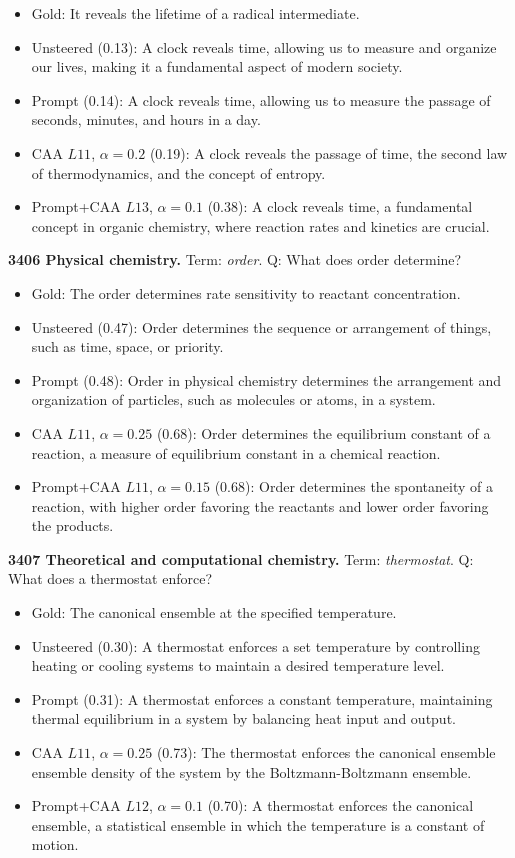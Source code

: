 \begin{itemize}\setlength{\itemsep}{0.15em}\setlength{\parsep}{0pt}\setlength{\topsep}{0.2em}
\item Gold: It reveals the lifetime of a radical intermediate.
\item Unsteered (0.13): A clock reveals time, allowing us to measure and organize our lives, making it a fundamental aspect of modern society.
\item Prompt (0.14): A clock reveals time, allowing us to measure the passage of seconds, minutes, and hours in a day.
\item CAA $L11$, $\alpha=0.2$ (0.19): A clock reveals the passage of time, the second law of thermodynamics, and the concept of entropy.
\item Prompt+CAA $L13$, $\alpha=0.1$ (0.38): A clock reveals time, a fundamental concept in organic chemistry, where reaction rates and kinetics are crucial.
\end{itemize}
\medskip\noindent\textbf{3406 Physical chemistry.} Term: \emph{order}.
Q: What does order determine?
\begin{itemize}\setlength{\itemsep}{0.15em}\setlength{\parsep}{0pt}\setlength{\topsep}{0.2em}
\item Gold: The order determines rate sensitivity to reactant concentration.
\item Unsteered (0.47): Order determines the sequence or arrangement of things, such as time, space, or priority.
\item Prompt (0.48): Order in physical chemistry determines the arrangement and organization of particles, such as molecules or atoms, in a system.
\item CAA $L11$, $\alpha=0.25$ (0.68): Order determines the equilibrium constant of a reaction, a measure of equilibrium constant in a chemical reaction.
\item Prompt+CAA $L11$, $\alpha=0.15$ (0.68): Order determines the spontaneity of a reaction, with higher order favoring the reactants and lower order favoring the products.
\end{itemize}
\medskip\noindent\textbf{3407 Theoretical and computational chemistry.} Term: \emph{thermostat}.
Q: What does a thermostat enforce?
\begin{itemize}\setlength{\itemsep}{0.15em}\setlength{\parsep}{0pt}\setlength{\topsep}{0.2em}
\item Gold: The canonical ensemble at the specified temperature.
\item Unsteered (0.30): A thermostat enforces a set temperature by controlling heating or cooling systems to maintain a desired temperature level.
\item Prompt (0.31): A thermostat enforces a constant temperature, maintaining thermal equilibrium in a system by balancing heat input and output.
\item CAA $L11$, $\alpha=0.25$ (0.73): The thermostat enforces the canonical ensemble ensemble density of the system by the Boltzmann-Boltzmann ensemble.
\item Prompt+CAA $L12$, $\alpha=0.1$ (0.70): A thermostat enforces the canonical ensemble, a statistical ensemble in which the temperature is a constant of motion.
\end{itemize}
